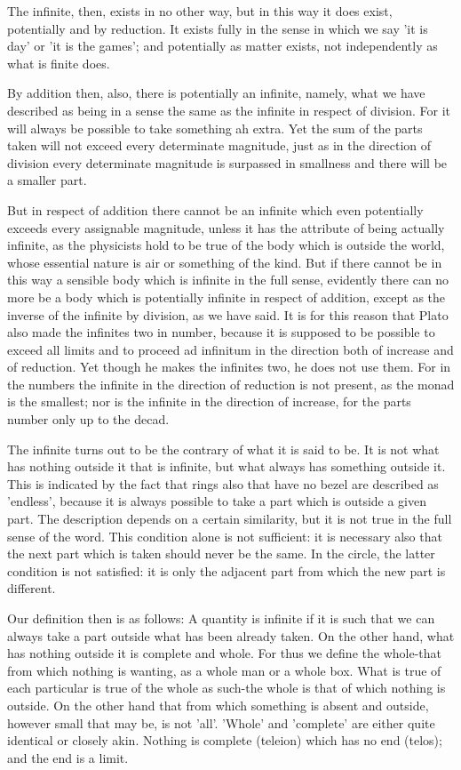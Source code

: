 The infinite, then, exists in no other way, but in this way it does
exist, potentially and by reduction. It exists fully in the sense
in which we say 'it is day' or 'it is the games'; and potentially
as matter exists, not independently as what is finite does.

By addition then, also, there is potentially an infinite, namely,
what we have described as being in a sense the same as the infinite
in respect of division. For it will always be possible to take something
ah extra. Yet the sum of the parts taken will not exceed every determinate
magnitude, just as in the direction of division every determinate
magnitude is surpassed in smallness and there will be a smaller part.

But in respect of addition there cannot be an infinite which even
potentially exceeds every assignable magnitude, unless it has the
attribute of being actually infinite, as the physicists hold to be
true of the body which is outside the world, whose essential nature
is air or something of the kind. But if there cannot be in this way
a sensible body which is infinite in the full sense, evidently there
can no more be a body which is potentially infinite in respect of
addition, except as the inverse of the infinite by division, as we
have said. It is for this reason that Plato also made the infinites
two in number, because it is supposed to be possible to exceed all
limits and to proceed ad infinitum in the direction both of increase
and of reduction. Yet though he makes the infinites two, he does not
use them. For in the numbers the infinite in the direction of reduction
is not present, as the monad is the smallest; nor is the infinite
in the direction of increase, for the parts number only up to the
decad. 

The infinite turns out to be the contrary of what it is said to be.
It is not what has nothing outside it that is infinite, but what always
has something outside it. This is indicated by the fact that rings
also that have no bezel are described as 'endless', because it is
always possible to take a part which is outside a given part. The
description depends on a certain similarity, but it is not true in
the full sense of the word. This condition alone is not sufficient:
it is necessary also that the next part which is taken should never
be the same. In the circle, the latter condition is not satisfied:
it is only the adjacent part from which the new part is different.

Our definition then is as follows: 
A quantity is infinite if it is such that we can always take a part
outside what has been already taken. On the other hand, what has nothing
outside it is complete and whole. For thus we define the whole-that
from which nothing is wanting, as a whole man or a whole box. What
is true of each particular is true of the whole as such-the whole
is that of which nothing is outside. On the other hand that from which
something is absent and outside, however small that may be, is not
'all'. 'Whole' and 'complete' are either quite identical or closely
akin. Nothing is complete (teleion) which has no end (telos); and
the end is a limit. 

